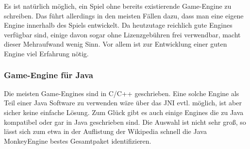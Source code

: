 \documentclass{article}
\begin{document}
Es ist natürlich möglich, ein Spiel ohne bereits existierende Game-Engine zu schreiben. Das führt allerdings in den
meisten Fällen dazu, dass man eine eigene Engine innerhalb des Spiels entwickelt. Da heutzutage reichlich gute Engines
verfügbar sind, einige davon sogar ohne Lizenzgebühren frei verwendbar, macht dieser Mehraufwand wenig Sinn. Vor allem
ist zur Entwicklung einer guten Engine viel Erfahrung nötig.

\subsubsection{Game-Engine für Java}

Die meisten Game-Engines sind in C/C++ geschrieben. Eine solche Engine als Teil einer Java Software zu verwenden wäre
über das JNI evtl. möglich, ist aber sicher keine einfache Lösung. Zum Glück gibt es auch einige Engines die zu Java
kompatibel oder gar in Java geschrieben sind.
Die Auswahl ist nicht sehr groß, so lässt sich zum etwa in der Auflistung der Wikipedia schnell die Java MonkeyEngine
bestes Gesamtpaket identifizieren.
\end{document}
